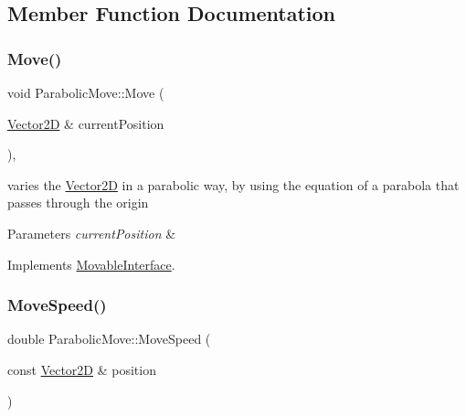 \subsection{Member Function Documentation}
\mbox{\label{class_parabolic_move_a577831644247ca57aa1c2c88843c779b}} 
\subsubsection{\texorpdfstring{Move()}{Move()}}
{\footnotesize\ttfamily void Parabolic\+Move\+::\+Move (\begin{DoxyParamCaption}\item[{\hyperlink{class_vector2_d}{Vector2D} \&}]{current\+Position }\end{DoxyParamCaption})\hspace{0.3cm}{\ttfamily [override]}, {\ttfamily [virtual]}}



varies the \hyperlink{class_vector2_d}{Vector2D} in a parabolic way, by using the equation of a parabola that passes through the origin 


\begin{DoxyParams}{Parameters}
{\em current\+Position} & \\
\hline
\end{DoxyParams}


Implements \hyperlink{class_movable_interface_a899cc1c78eacbee13b906c6770e7f025}{Movable\+Interface}.

\mbox{\label{class_parabolic_move_a1fde73a6298c970648344e0e232659d5}} 
\subsubsection{\texorpdfstring{Move\+Speed()}{MoveSpeed()}}
{\footnotesize\ttfamily double Parabolic\+Move\+::\+Move\+Speed (\begin{DoxyParamCaption}\item[{const \hyperlink{class_vector2_d}{Vector2D} \&}]{position }\end{DoxyParamCaption})\hspace{0.3cm}{\ttfamily [private]}}




